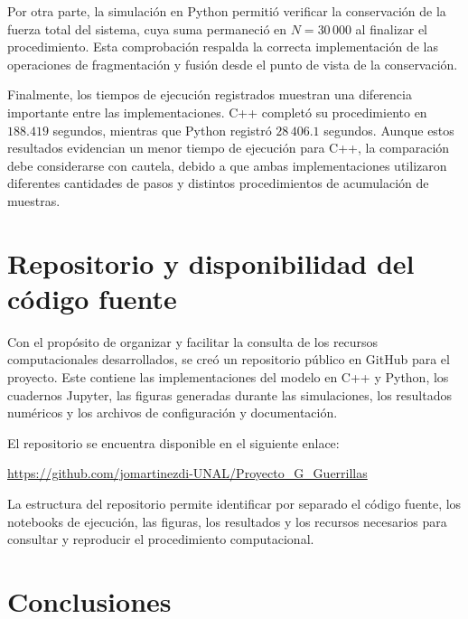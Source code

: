 \documentclass[
a4paper,
amsfonts,
amssymb,
amsmath,
reprint,
twoside
]{revtex4-1}
\begin{document}
Por otra parte, la simulación en Python permitió verificar la
conservación de la fuerza total del sistema, cuya suma permaneció
en $N=30\,000$ al finalizar el procedimiento. Esta comprobación
respalda la correcta implementación de las operaciones de
fragmentación y fusión desde el punto de vista de la conservación.

Finalmente, los tiempos de ejecución registrados muestran una
diferencia importante entre las implementaciones. C++ completó
su procedimiento en $188.419$ segundos, mientras que Python
registró $28\,406.1$ segundos. Aunque estos resultados evidencian
un menor tiempo de ejecución para C++, la comparación debe
considerarse con cautela, debido a que ambas implementaciones
utilizaron diferentes cantidades de pasos y distintos
procedimientos de acumulación de muestras.


\section{Repositorio y disponibilidad del código fuente}

Con el propósito de organizar y facilitar la consulta de los
recursos computacionales desarrollados, se creó un repositorio
público en GitHub para el proyecto. Este contiene las
implementaciones del modelo en C++ y Python, los cuadernos
Jupyter, las figuras generadas durante las simulaciones,
los resultados numéricos y los archivos de configuración
y documentación.

El repositorio se encuentra disponible en el siguiente enlace:

\begin{center}
    \url{https://github.com/jomartinezdi-UNAL/Proyecto_G_Guerrillas}
\end{center}

La estructura del repositorio permite identificar por separado
el código fuente, los notebooks de ejecución, las figuras,
los resultados y los recursos necesarios para consultar
y reproducir el procedimiento computacional.


\section{Conclusiones}
\end{document}
